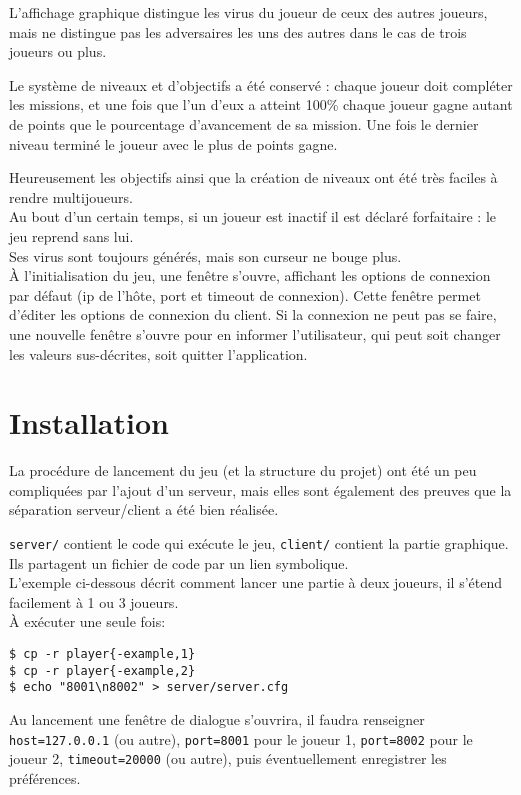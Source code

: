 \documentclass[a4paper,french]{article}
\newcommand{\ttt}[1]{\texttt{#1}}
\begin{document}
L'affichage graphique distingue les virus du joueur de ceux des autres joueurs, mais ne distingue pas les
adversaires les uns des autres dans le cas de trois joueurs ou plus.

Le système de niveaux et d'objectifs a été conservé : chaque joueur doit compléter les missions,
et une fois que l'un d'eux a atteint 100\% chaque joueur gagne autant de points que le pourcentage d'avancement
de sa mission. Une fois le dernier niveau terminé le joueur avec le plus de points gagne.

Heureusement les objectifs ainsi que la création de niveaux ont été très faciles à rendre multijoueurs.\\

Au bout d'un certain temps, si un joueur est inactif il est déclaré forfaitaire : le jeu reprend sans lui.\\
Ses virus sont toujours générés, mais son curseur ne bouge plus.\\

\`A l'initialisation du jeu, une fenêtre s'ouvre, affichant les options de connexion par défaut (ip de l'hôte, port et
timeout de connexion). Cette fenêtre permet d'éditer les options de connexion du client. Si la connexion ne peut pas se
faire, une nouvelle fenêtre s'ouvre pour en informer l'utilisateur, qui peut soit changer les valeurs sus-décrites, soit
quitter l'application.


\section{Installation}

La procédure de lancement du jeu (et la structure du projet) ont été un peu compliquées par l'ajout d'un serveur,
mais elles sont également des preuves que la séparation serveur/client a été bien réalisée.

\ttt{server/} contient le code qui exécute le jeu, \ttt{client/} contient la partie graphique. Ils partagent
un fichier de code par un lien symbolique.\\

L'exemple ci-dessous décrit comment lancer une partie à deux joueurs, il s'étend facilement à 1 ou 3 joueurs.\\

\`A exécuter une seule fois:
\begin{lstlisting}
$ cp -r player{-example,1}
$ cp -r player{-example,2}
$ echo "8001\n8002" > server/server.cfg
\end{lstlisting}
Au lancement une fenêtre de dialogue s'ouvrira, il faudra renseigner \ttt{host=127.0.0.1} (ou autre),
\ttt{port=8001} pour le joueur 1, \ttt{port=8002} pour le joueur 2, \ttt{timeout=20000} (ou autre),
puis éventuellement enregistrer les préférences.\\
\end{document}
